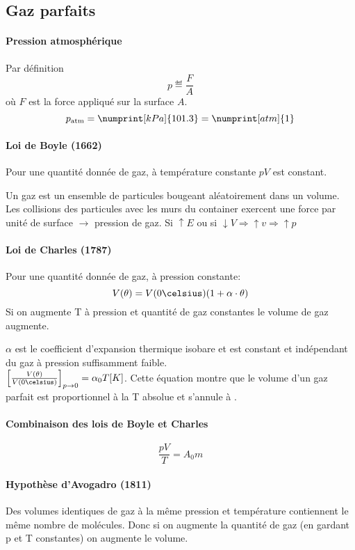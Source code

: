 \subsection{Gaz parfaits}

\paragraph{Pression atmosphérique}
Par définition
$$p \eqdef \frac{F}{A}$$
où $F$ est la force appliqué sur la surface $A$.
\[ p_\mathrm{atm}=\numprint[kPa]{101.3}=\numprint[atm]{1} \]

\paragraph{Loi de Boyle (1662)}
Pour une quantité donnée de gaz,
à température constante $p V$ est constant.

Un gaz est un ensemble de particules bougeant aléatoirement dans un volume.
Les collisions des particules avec les murs du container exercent une force par unité de surface $\rightarrow$ pression de gaz.
Si $\uparrow E$ ou si $\downarrow V \Rightarrow \uparrow v \Rightarrow \uparrow p$

\paragraph{Loi de Charles (1787)}
Pour une quantité donnée de gaz,
à pression constante:
\[ V(\theta)=V(0\celsius)(1+\alpha\cdot \theta) \]
Si on augmente T à pression et quantité de gaz constantes le volume de gaz augmente.

$\alpha$ est le coefficient d'expansion thermique isobare et est constant et indépendant du gaz à pression suffisamment faible.\\

$\left[\frac{V(\theta)}{V(0\celsius)}\right]_{p\rightarrow0}=\alpha_0T[K]$.
Cette équation montre que le volume d'un gaz parfait est proportionnel à la T absolue et s'annule à .

\paragraph{Combinaison des lois de Boyle et Charles}
$$\frac{pV}{T}=A_0m$$

\paragraph{Hypothèse d'Avogadro (1811)}
Des volumes identiques de gaz à la même pression et température contiennent le même nombre de molécules.
Donc si on augmente la quantité de gaz (en gardant p et T constantes) on augmente le volume.

